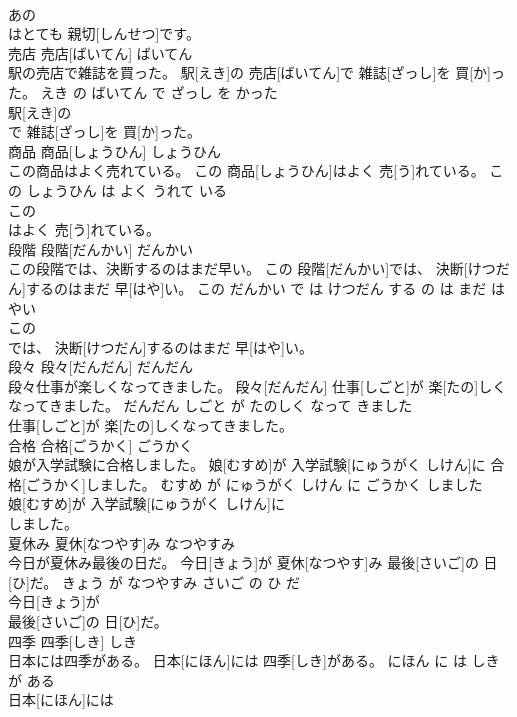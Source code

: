 \documentclass[8pt]{extreport}
\begin{document}
\begin{CJK}{UTF8}{min}
\\	あの
\\	はとても 親切[しんせつ]です。			
\\	売店	売店[ばいてん]	ばいてん	
\\	駅の売店で雑誌を買った。	駅[えき]の 売店[ばいてん]で 雑誌[ざっし]を 買[か]った。	えき の ばいてん で ざっし を かった	
\\	駅[えき]の
\\	で 雑誌[ざっし]を 買[か]った。			
\\	商品	商品[しょうひん]	しょうひん	
\\	この商品はよく売れている。	この 商品[しょうひん]はよく 売[う]れている。	この しょうひん は よく うれて いる	
\\	この
\\	はよく 売[う]れている。			
\\	段階	段階[だんかい]	だんかい	
\\	この段階では、決断するのはまだ早い。	この 段階[だんかい]では、 決断[けつだん]するのはまだ 早[はや]い。	この だんかい で は けつだん する の は まだ はやい	
\\	この
\\	では、 決断[けつだん]するのはまだ 早[はや]い。			
\\	段々	段々[だんだん]	だんだん	
\\	段々仕事が楽しくなってきました。	段々[だんだん] 仕事[しごと]が 楽[たの]しくなってきました。	だんだん しごと が たのしく なって きました	
\\	仕事[しごと]が 楽[たの]しくなってきました。			
\\	合格	合格[ごうかく]	ごうかく	
\\	娘が入学試験に合格しました。	娘[むすめ]が 入学試験[にゅうがく しけん]に 合格[ごうかく]しました。	むすめ が にゅうがく しけん に ごうかく しました	
\\	娘[むすめ]が 入学試験[にゅうがく しけん]に
\\	しました。			
\\	夏休み	夏休[なつやす]み	なつやすみ	
\\	今日が夏休み最後の日だ。	今日[きょう]が 夏休[なつやす]み 最後[さいご]の 日[ひ]だ。	きょう が なつやすみ さいご の ひ だ	
\\	今日[きょう]が
\\	最後[さいご]の 日[ひ]だ。			
\\	四季	四季[しき]	しき	
\\	日本には四季がある。	日本[にほん]には 四季[しき]がある。	にほん に は しき が ある	
\\	日本[にほん]には

\end{CJK}
\end{document}
